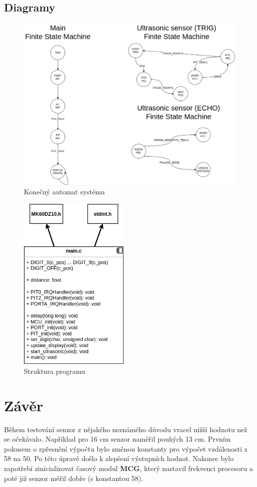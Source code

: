 \documentclass[a4paper,11pt]{article}
\begin{document}
    \subsection{Diagramy}
    \begin{figure}[ht!]
        \centering
        \includegraphics[width=450pt]{FSM}
        \caption{Konečný automat systému}
    \end{figure}
    \begin{figure}[ht!]
        \centering
        \includegraphics[width=150pt]{program}
        \caption{Struktura programu}
    \end{figure}
    \newpage

    \section{Závěr}
    Během testování senzor z nějakého neznámého důvodu vracel nižší hodnotu než se očekávalo. Například pro 16 cm senzor naměřil pouhých 13 cm.
    Prvním pokusem o zpřesnění výpočtu bylo změnou konstanty pro výpočet vzdálenosti z 58 na 50. Po této úpravě došlo k zlepšení výstupních hodnot.
    Nakonec bylo zapotřebí zinicializovat časový modul \textbf{MCG}, který nastavil frekvenci procesoru a poté již senzor měřil dobře (s konstantou 58).
    
\end{document}
